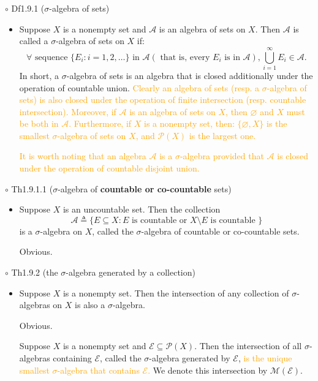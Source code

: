 \documentclass{article}
\begin{document}
{\Large $\circ $ Df1.9.1 ($\sigma $-algebra of sets)}\par
\begin{itemize}
    \item[]
    {\large Suppose $X$ is a nonempty set and $\mathcal{A} $ is an algebra of sets on $X$. 
    Then $\mathcal{A}$ is called a $\sigma $-algebra of sets on $X$ if:
    $$\forall \text{ sequence } \{E_i: i=1,2,\dots\} \text{ in } \mathcal{A}(\text{ that is, every } E_i \text{ is in } \mathcal{A}), 
    \bigcup_{i=1}^{\infty}E_i \in \mathcal{A}.$$}
    {\textcolor{pf}{In short, a $\sigma $-algebra of sets is an algebra 
    that is closed additionally under the operation of countable union. }}
    {\textcolor{orange}{Clearly an algebra of sets (resp. a $\sigma$-algebra of sets) 
    is also closed under the operation of finite intersection (resp. countable intersection). Moreover, if $\mathcal{A} $ is an
    algebra of sets on $X$, then $\varnothing$ and $X$ must be both in $\mathcal{A} $. Furthermore, if $X$ is a nonempty set, then:
    $\{\varnothing, X\}$ is the smallest $\sigma$-algebra of sets on $X$, and $\mathcal{P}(X) $ is the largest one.}}\par
    {\textcolor{orange}{It is worth noting that an algebra $\mathcal{A} $ is a $\sigma$-algebra provided that 
    $\mathcal{A} $ is closed under the operation of countable disjoint union.}}
\end{itemize}\par
\quad

{\Large $\circ $ Th1.9.1.1 ($\sigma $-algebra of \textbf{countable or co-countable} sets)}\par
\begin{itemize}
    \item[]
    {\large Suppose $X$ is an uncountable set. Then the collection
    $$\mathcal{A} \triangleq \{E\subseteq X: E \text{ is countable or } X\setminus E \text{ is countable }\}$$
    is a $\sigma $-algebra on $X$, called the $\sigma $-algebra of countable or co-countable sets.}\par
    {\textcolor{pf}{Obvious.}}
\end{itemize}\par
\quad

{\Large $\circ $ Th1.9.2 (the $\sigma $-algebra generated by a collection)}\par
\begin{itemize}
    \item[]
    {\large Suppose $X$ is a nonempty set. Then the intersection of any collection of $\sigma $-algebras on $X$
    is also a $\sigma $-algebra.}\par
    {\textcolor{pf}{Obvious.}}\par
    {\textcolor{pf}{Suppose $X$ is a nonempty set and $\mathcal{E}\subseteq \mathcal{P}(X)$. Then the intersection
    of all $\sigma $-algebras containing $\mathcal{E}$, called the $\sigma $-algebra generated by $\mathcal{E}$, 
    \textcolor{orange}{is the unique smallest $\sigma $-algebra that contains $\mathcal{E} $.} 
    We denote this intersection by $\mathcal{M}(\mathcal{E} ) $. }}
\end{itemize}\par
\quad
\end{document}
